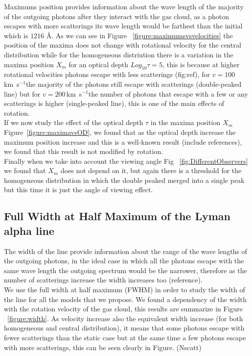 \documentclass[usenatbib]{mn2e}
\newcommand{\kms}{\,km~s$^{-1}$}
\begin{document}
Maximums position provides information about the wave length of the
majority of the outgoing photons after they interact with the gas cloud, as a photon escapes with more scatterings its wave length would be
farthest than the initial which is $1216$ {\AA}. 
As we can see in Figure ~\ref{figure:maximumsvsvelocities} the
position of the maxima does not change with rotational velocity for
the central distribution while for the homogeneous
distriution there is a variation in the maxima position $X_{m}$ for an optical depth $Log_{10}\tau=5$,
this is because at higher rotational velocities photons escape with
less scatterings (fig:ref), for $v=100$\kms the majority of the photons
still escape with scatterings (double-peaked line) but for $v=200$\kms the number
of photons that escape with a few or any scatterings is higher (single-peaked line), this
is one of the main effects of rotation. \\ 

If we now study the effect of the optical depth $\tau$ in the maxima position $X_{m}$ Figure~\ref{figure:maximavsOD}, we found that as the optical depth increase the maximum position increase and this is a well-known result (include references), we found that this result is not modified by rotation.\\

Finally when we take into account the viewing angle Fig ~\ref{fig:DifferentObservers} we found that $X_{m}$ does not depend on it, but again there is a threshold for the homogeneous distribution in which  the double peaked merged into a single peak but this time it is just the angle of viewing effect.

\subsection{Full Width at Half Maximum of the Lyman alpha line}
\label{sec:LW}

The width of the line provide information about the range of the wave lengths of the outgoing photons, in the ideal case in which all the photons escape with the same wave length the outgoing spectrum would be the narrower, therefore as the number of scatterings increase the width increases too (reference).	\\


We use the full width at half maximum (FWHM) in order to study the width of the line for all the models that we propose. We found a dependency of the width with the rotation velocity of the gas cloud, this results are summarize in Figure ~\ref{figure:width}. As velocity increase also the equivalent width increase (for both homogeneous and central distribution), it means that some photons escape with fewer scatterings than the static case but at the same time a few photons escape with more scatterings, this can be seen clearly in Figure. (Nscatt)\\
\end{document}
